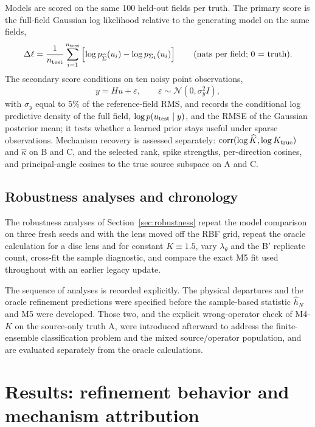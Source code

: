 \documentclass[11pt]{article}
\numberwithin{table}{section}
\numberwithin{figure}{section}
\begin{document}
Models are scored on the same 100 held-out fields per truth. The primary score is the full-field Gaussian log likelihood relative to the generating model on the same fields,
\begin{equation}
    \Delta\ell
    =
    \frac{1}{n_{\rm test}}\sum_{i=1}^{n_{\rm test}}
    \left[\log p_{\widehat\Sigma}(u_i)-\log p_{\Sigma_1}(u_i)\right]
    \qquad\text{(nats per field; $0$ = truth).}
\end{equation}
The secondary score conditions on ten noisy point observations,
\begin{equation}
    y=Hu+\varepsilon,
    \qquad
    \varepsilon\sim\mathcal N(0,\sigma_y^2I),
\end{equation}
with $\sigma_y$ equal to $5\%$ of the reference-field RMS, and records the conditional log predictive density of the full field, $\log p(u_{\rm test}\mid y)$, and the RMSE of the Gaussian posterior mean; it tests whether a learned prior stays useful under sparse observations. Mechanism recovery is assessed separately: $\mathrm{corr}(\log\widehat K,\log K_{\rm true})$ and $\widehat\kappa$ on B and C, and the selected rank, spike strengths, per-direction cosines, and principal-angle cosines to the true source subspace on A and C.

\subsection{Robustness analyses and chronology}
\label{sec:robustness_design}

The robustness analyses of Section~\ref{sec:robustness} repeat the model comparison on three fresh seeds and with the lens moved off the RBF grid, repeat the oracle calculation for a disc lens and for constant $K\equiv1.5$, vary $\lambda_\theta$ and the B$'$ replicate count, cross-fit the sample diagnostic, and compare the exact M5 fit used throughout with an earlier legacy update.

The sequence of analyses is recorded explicitly. The physical departures and the oracle refinement predictions were specified before the sample-based statistic $\widehat h_N$ and M5 were developed. Those two, and the explicit wrong-operator check of M4-$K$ on the source-only truth A, were introduced afterward to address the finite-ensemble classification problem and the mixed source/operator population, and are evaluated separately from the oracle calculations.

\section{Results: refinement behavior and mechanism attribution}
\label{sec:results}
\end{document}
